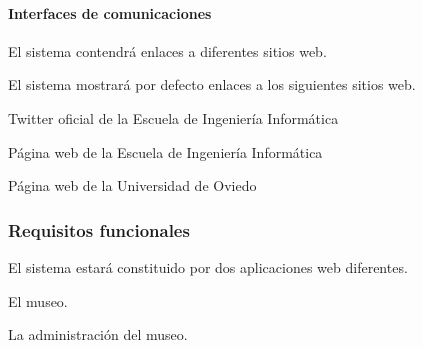 
\paragraph*{Interfaces de comunicaciones}
\begin{myEnumIC}
	\item El sistema contendrá enlaces a diferentes sitios web.
	\item El sistema mostrará por defecto enlaces a los siguientes sitios web.
	\begin{myEnumIC}
		\item Twitter oficial de la Escuela de Ingeniería Informática
		\item Página web de la Escuela de Ingeniería Informática
		\item Página web de la Universidad de Oviedo
	\end{myEnumIC}
\end{myEnumIC}


\subsubsection{Requisitos funcionales}
\begin{myEnumRF}
	\item El sistema estará constituido por dos aplicaciones web diferentes.
	\begin{myEnumRF}
		\item El museo.
		\item La administración del museo.
	\end{myEnumRF}
\end{myEnumRF}

